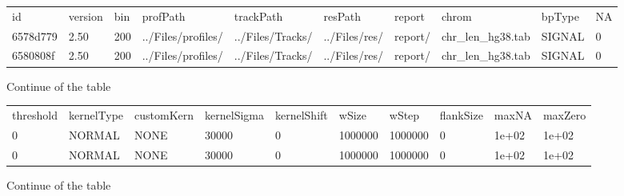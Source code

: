 \documentclass{article}
\newcommand{\tw}{\textwidth}
\begin{document}
\begin{flushleft}
\begin{minipage}{0.9\tw}
\begin{shaded} 
\begin{scriptsize}
\begin{tabular}{llllllllll}
id       & version & bin & profPath           & trackPath        & resPath       & report  & chrom             & bpType& NA \\
6578d779 & 2.50    & 200 & ../Files/profiles/ & ../Files/Tracks/ & ../Files/res/ & report/ & chr\_len\_hg38.tab& SIGNAL& 0  \\
6580808f & 2.50    & 200 & ../Files/profiles/ & ../Files/Tracks/ & ../Files/res/ & report/ & chr\_len\_hg38.tab& SIGNAL& 0  \\
\end{tabular}
\end{scriptsize}
\end{shaded}
\end{minipage}
\end{flushleft}
Continue of the table
                                                                                                                        \begin{flushright}                                                                                                                        \begin{minipage}{0.9\tw}
\begin{shaded} 
\begin{scriptsize}
\begin{tabular}{llllllllll}
 threshold & kernelType & customKern & kernelSigma & kernelShift & wSize   & wStep   & flankSize & maxNA & maxZero\\
 0         & NORMAL     & NONE       & 30000       & 0           & 1000000 & 1000000 & 0         & 1e+02 & 1e+02  \\
 0         & NORMAL     & NONE       & 30000       & 0           & 1000000 & 1000000 & 0         & 1e+02 & 1e+02  \\
\end{tabular}
\end{scriptsize}
\end{shaded}
\end{minipage}                                                                                                                         \end{flushright}

Continue of the table
\end{document}
